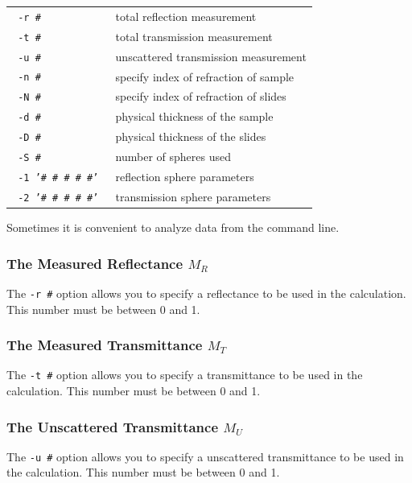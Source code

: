 \documentclass{article}
\begin{document}
\begin{center}
\begin{tabular}{lp{7cm}}
\texttt{ -r \#               }& total reflection measurement               \\
\texttt{ -t \#               }& total transmission measurement             \\
\texttt{ -u \#               }& unscattered transmission measurement       \\[3mm]
\texttt{ -n \#               }& specify index of refraction of sample      \\
\texttt{ -N \#               }& specify index of refraction of slides      \\
\texttt{ -d \#               }& physical thickness of the sample           \\
\texttt{ -D \#               }& physical thickness of the slides           \\
\texttt{ -S \#               }& number of spheres used                     \\
\texttt{ -1 '\# \# \# \# \#' }& reflection sphere parameters               \\
\texttt{ -2 '\# \# \# \# \#' }& transmission sphere parameters             \\
\end{tabular}
\end{center}

Sometimes it is convenient to analyze data from the command line.

\subsubsection{The Measured Reflectance $M_R$}
The \texttt{-r \#} option allows you to specify a reflectance to be
used in the calculation.  This number must be between 0 and 1.

\subsubsection{The Measured Transmittance $M_T$}
The \texttt{-t \#} option allows you to specify a transmittance to be
used in the calculation.  This number must be between 0 and 1.

\subsubsection{The Unscattered Transmittance $M_U$}
The \texttt{-u \#} option allows you to specify a unscattered transmittance to be
used in the calculation.  This number must be between 0 and 1.
\end{document}
